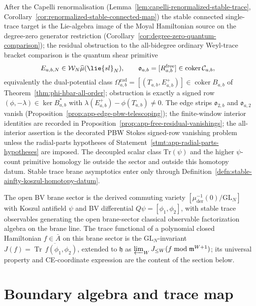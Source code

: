\documentclass[11pt]{memoir}
\begin{document}
\begin{rmk}\label{rmk:open-trace-koszul-admissibility}
  After the Capelli renormalisation
  (Lemma~\ref{lem:capelli-renormalized-stable-trace},
  Corollary~\ref{cor:renormalized-stable-connected-map}) the stable
  connected single-trace target is the Lie-algebra image of the Moyal
  Hamiltonian source on the degree-zero generator restriction
  (Corollary~\ref{cor:degree-zero-quantum-comparison}); the residual
  obstruction to the all-bidegree ordinary Weyl-trace bracket
  comparison is the quantum shear primitive
  \[
    E_{a,b,N}
      \in\mathcal W_N\widehat\mu(\lie{sl}_N),
    \qquad
    \mathfrak o_{a,b}
      =[R^{\mathrm{free}}_{a,b}]
      \in\operatorname{coker}\mathcal C_{a,b},
  \]
  equivalently the dual-potential class
  \(\Omega^{\mathrm{rad}}_{a,b}=[(T_{a,b},E^+_{a,b})]
   \in\operatorname{coker}B_{a,b}\)
  of Theorem~\ref{thm:phi-hbar-all-order}; obstruction is exactly a signed
  row \((\phi,-\lambda)\in\ker B_{a,b}^*\) with
  \(\lambda(E^+_{a,b})-\phi(T_{a,b})\ne0\).  The edge strips
  \(\mathfrak o_{2,b}\) and \(\mathfrak o_{a,2}\) vanish
  (Proposition~\ref{prop:app-edge-pbw-telescoping}); the
  finite-window interior identities are recorded in
  Proposition~\ref{prop:app-free-residual-vanishings}; the
  all-interior assertion is the decorated PBW Stokes signed-row
  vanishing problem unless the radial-parts hypotheses of
  Statement~\ref{stmt:app-radial-parts-hypotheses} are imposed.  The
  decoupled scalar class
  \(\mathrm{Tr}(\psi)\) and the higher \(\psi\)-count primitive
  homology lie outside the sector and outside this homotopy datum.
  Stable trace brane asymptotics enter only through
  Definition~\ref{defn:stable-ainfty-koszul-homotopy-datum}.
\end{rmk}

The open BV brane sector is the derived commuting variety
\([\mu^{-1}_{\mathrm{der}}(0)/\mathrm{GL}_N]\) with Koszul antifield
\(\psi\) and BV differential \(Q\psi=[\phi_1,\phi_2]\), with stable
trace observables generating the open brane-sector classical
observable factorization algebra on the brane line.  The trace
functional of a polynomial closed Hamiltonian \(f\in\bar A\) on this
brane sector is the \(\mathrm{GL}_N\)-invariant
\(J(f)=\overline{\operatorname{Tr}\,f(\phi_1,\phi_2)}\), extended to
\(\mathfrak h\) as
\(\varprojlim_WJ_{\leq W}(f\bmod\mathfrak m^{W+1})\); its
universal property and CE-coordinate expression are the content of
the section below.

\section{Boundary algebra and trace map}\label{sec:trace-map}
\end{document}
